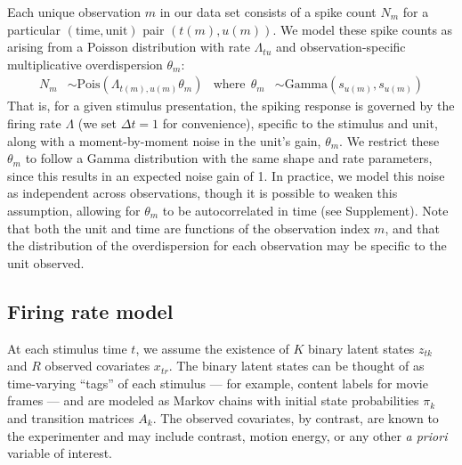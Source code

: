 \documentclass[10pt,letterpaper]{article}
\newcommand{\added}[1]{\textcolor{added}{#1}}
\begin{document}
\added{Each unique observation $m$ in our data set consists of a spike count $N_m$ for a particular $(\mathrm{time}, \mathrm{unit})$ pair $(t(m), u(m))$.}
We model these spike counts as arising from a Poisson \added{distribution} with rate $\Lambda_{tu}$ and observation-specific multiplicative overdispersion $\theta_m$:
\begin{align}
    \label{obs_model}
    N_{m} &\sim \text{Pois}(\Lambda_{t(m), u(m)} \theta_m) &
    \text{where} ~~ \theta_m &\sim \text{Gamma}(s_{u(m)}, s_{u(m)})
\end{align}
That is, for a given stimulus presentation, the spiking response is governed by the firing rate $\Lambda$ \added{(we set $\Delta t = 1$ for convenience)}, specific to the stimulus and unit, along with a moment-by-moment noise in the unit's gain, $\theta_m$. We restrict these $\theta_m$ to follow a Gamma distribution with the same shape and rate parameters, since this results in an expected noise gain of 1. In practice, we model this noise as independent across observations, though it is possible to weaken this assumption, allowing for $\theta_m$ to be autocorrelated in time (see Supplement). Note that both the unit and time are functions of the observation index $m$, and that the distribution of the overdispersion for each observation may be specific to the unit observed.

\subsection*{Firing rate model}
At each stimulus time $t$, we assume the existence of $K$ binary latent states $z_{tk}$ and $R$ observed covariates $x_{tr}$. The binary latent states can be thought of as time-varying ``tags'' of each stimulus --- for example, content labels for movie frames --- and are modeled as Markov chains with initial state probabilities $\pi_k$ and transition matrices $A_k$. The observed covariates, by contrast, are known to the experimenter and may include contrast, motion energy, or any other \emph{a priori} variable of interest.
\end{document}
